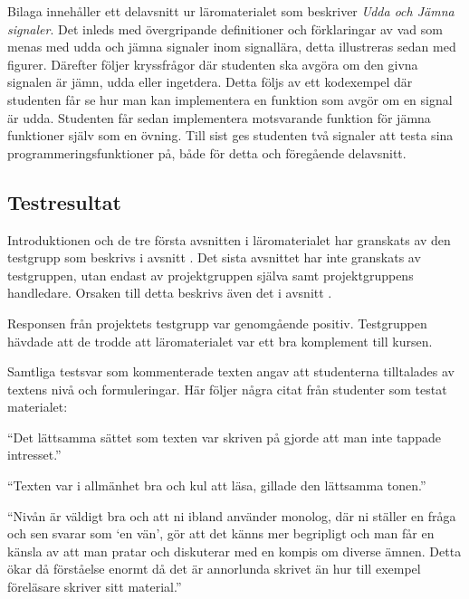 \documentclass[12pt,a4paper,twoside,openright]{article}
\begin{document}
Bilaga  innehåller ett delavsnitt ur läromaterialet som
beskriver \textit{Udda och Jämna signaler}. Det inleds med
övergripande definitioner och förklaringar av vad som menas med udda
och jämna signaler inom signallära, detta illustreras sedan med
figurer. Därefter följer kryssfrågor där studenten ska avgöra om den
givna signalen är jämn, udda eller ingetdera. Detta följs av ett
kodexempel där studenten får se hur man kan implementera en funktion
som avgör om en signal är udda. Studenten får sedan implementera
motsvarande funktion för jämna funktioner själv som en övning. Till
sist ges studenten två signaler att testa sina
programmeringsfunktioner på, både för detta och föregående delavsnitt.


\subsection{Testresultat}
\label{sec:testResultat}
Introduktionen och de tre första avsnitten i läromaterialet har
granskats av den testgrupp som beskrivs i avsnitt
. Det sista avsnittet har inte granskats av
testgruppen, utan endast av projektgruppen själva samt projektgruppens
handledare. Orsaken till detta beskrivs även det i avsnitt
.

Responsen från projektets testgrupp var genomgående
positiv. Testgruppen hävdade att de trodde att läromaterialet var ett
bra komplement till kursen.

Samtliga testsvar som kommenterade texten angav att studenterna
tilltalades av textens nivå och formuleringar. Här följer några citat
från studenter som testat materialet:
\begin{displayquote}
  ``Det lättsamma sättet som texten var skriven på gjorde att man
  inte tappade intresset.''
\end{displayquote}

\begin{displayquote}
  ``Texten var i allmänhet bra och kul att läsa, gillade den
  lättsamma tonen.''
\end{displayquote}

\begin{displayquote}
  ``Nivån är väldigt bra och att ni ibland använder monolog, där
  ni ställer en fråga och sen svarar som `en vän', gör att det känns
  mer begripligt och man får en känsla av att man pratar och
  diskuterar med en kompis om diverse ämnen. Detta ökar då förståelse
  enormt då det är annorlunda skrivet än hur till exempel föreläsare
  skriver sitt material.''
\end{displayquote}
\end{document}
